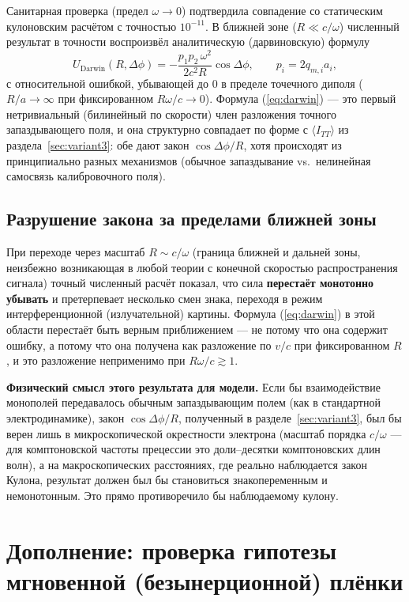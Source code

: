 \documentclass[12pt,a4paper]{article}
\begin{document}
Санитарная проверка (предел $\omega\to0$) подтвердила совпадение со
статическим кулоновским расчётом с точностью $10^{-11}$. В ближней
зоне ($R\ll c/\omega$) численный результат в точности воспроизвёл
аналитическую (дарвиновскую) формулу
\begin{equation}
U_{\text{Darwin}}(R,\Delta\phi)=-\frac{p_1p_2\,\omega^2}{2c^2R}\cos\Delta\phi,
\qquad p_i=2q_{m,i}a_i,
\label{eq:darwin}
\end{equation}
с относительной ошибкой, убывающей до $0$ в пределе точечного диполя
($R/a\to\infty$ при фиксированном $R\omega/c\to0$). Формула
(\ref{eq:darwin}) --- это первый нетривиальный (билинейный по скорости)
член разложения точного запаздывающего поля, и она структурно совпадает
по форме с $\langle I_{TT}\rangle$ из раздела~\ref{sec:variant3}: обе
дают закон $\cos\Delta\phi/R$, хотя происходят из принципиально разных
механизмов (обычное запаздывание vs.\ нелинейная самосвязь калибровочного
поля).

\subsection{Разрушение закона за пределами ближней зоны}

При переходе через масштаб $R\sim c/\omega$ (граница ближней и дальней
зоны, неизбежно возникающая в любой теории с конечной скоростью
распространения сигнала) точный численный расчёт показал, что сила
\textbf{перестаёт монотонно убывать} и претерпевает несколько смен знака,
переходя в режим интерференционной (излучательной) картины. Формула
(\ref{eq:darwin}) в этой области перестаёт быть верным приближением ---
не потому что она содержит ошибку, а потому что она получена как
разложение по $v/c$ при фиксированном $R$, и это разложение неприменимо
при $R\omega/c\gtrsim1$.

\textbf{Физический смысл этого результата для модели.} Если бы
взаимодействие монополей передавалось обычным запаздывающим полем (как
в стандартной электродинамике), закон $\cos\Delta\phi/R$, полученный в
разделе~\ref{sec:variant3}, был бы верен лишь в микроскопической
окрестности электрона (масштаб порядка $c/\omega$ --- для комптоновской
частоты прецессии это доли--десятки комптоновских длин волн), а на
макроскопических расстояниях, где реально наблюдается закон Кулона,
результат должен был бы становиться знакопеременным и немонотонным.
Это прямо противоречило бы наблюдаемому кулону.

\section{Дополнение: проверка гипотезы мгновенной (безынерционной) плёнки}
\label{sec:instant-check}
\end{document}
